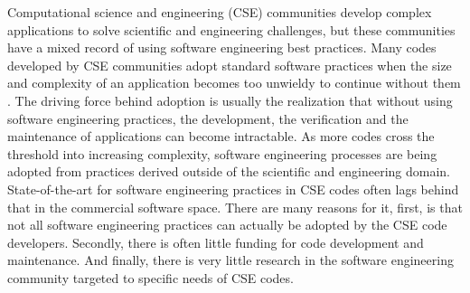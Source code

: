 \label{sec:introduction}
Computational science and engineering (CSE) communities develop
complex applications to solve scientific and engineering challenges,
but these communities have a mixed record of using software
engineering best practices. Many codes developed by CSE communities
adopt standard software practices when the size and complexity of an
application becomes too unwieldy to continue without them
\cite{cc2012}. The driving force behind adoption is usually the
realization that without using software engineering practices, the
development, the verification and the maintenance of applications can become
intractable. As more codes cross the threshold into increasing
complexity, software engineering processes are being adopted from
practices derived outside of the scientific and engineering domain.
State-of-the-art for software engineering practices in CSE codes often lags
behind that in the commercial software space. 
There are many reasons for it, first, is
that not all software engineering practices can actually be adopted by
the CSE code developers.  Secondly, there is often little funding for
code development and maintenance. And finally, there is very little
research in the software engineering community targeted to specific
needs of CSE codes. 

